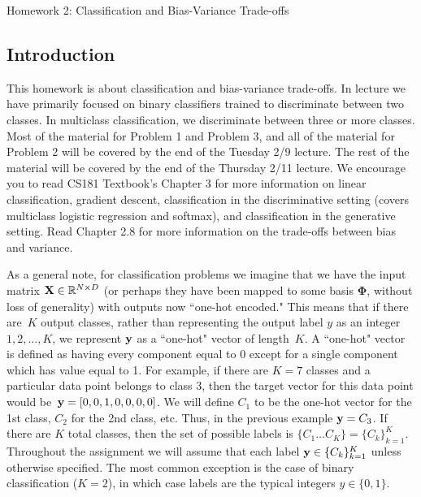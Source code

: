 \documentclass[submit]{harvardml}
\begin{document}
\begin{center}
{\Large Homework 2: Classification and Bias-Variance Trade-offs}\\
\end{center}

\subsection*{Introduction}

This homework is about classification and bias-variance trade-offs. In
lecture we have primarily focused on binary classifiers trained to
discriminate between two classes. In multiclass classification, we
discriminate between three or more classes.  Most of the material for Problem 1 and Problem 3, and all of the material for Problem 2 will be covered by the end of the Tuesday 2/9 lecture. The rest of the material will be covered by the end of the Thursday 2/11 lecture.  We encourage you to read
CS181 Textbook's Chapter 3 for more information on linear
classification, gradient descent, classification in the discriminative
setting (covers multiclass logistic regression and softmax), and
classification in the generative setting. Read Chapter 2.8 for more
information on the trade-offs between bias and variance.

As a general note, for classification problems we imagine that we have
the input matrix $\mathbf{X} \in \mathbb{R}^{N \times D}$ (or perhaps they
have been mapped to some basis $\bm{\Phi}$, without loss of
generality) with outputs now ``one-hot encoded."  This means that if
there are~$K$ output classes, rather than representing the output
label $y$ as an integer~${1,2,\ldots,K}$, we represent $\mathbf{y}$ as a
``one-hot" vector of length~$K$. A ``one-hot" vector is defined as
having every component equal to 0 except for a single component which
has value equal to 1.  For example, if there are $K = 7$ classes and a
particular data point belongs to class 3, then the target vector for
this data point would be~$\mathbf{y} = [0,0,1,0,0,0,0]$.  We will define
$C_1$ to be the one-hot vector for the 1st class, $C_2$ for the 2nd
class, etc.  Thus, in the previous example $\mathbf{y} = C_3$. If there
are $K$ total classes, then the set of possible labels is $\{C_1
\ldots C_K \} = \{C_k\}_{k=1}^K$.  Throughout the assignment we will
assume that each label $\mathbf{y} \in \{C_k\}_{k=1}^K$ unless otherwise
specified. The most common exception is the case of binary classification
($K = 2$), in which case labels are the typical integers $y \in \{0, 1\}$.\\
\end{document}
